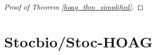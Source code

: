 \documentclass[11pt, twoside]{report}
\begin{document}
\begin{proof}[Proof of Theorem \ref{hoag_thm_simplified}]

\end{proof}


\section{Stocbio/Stoc-HOAG}
\end{document}
